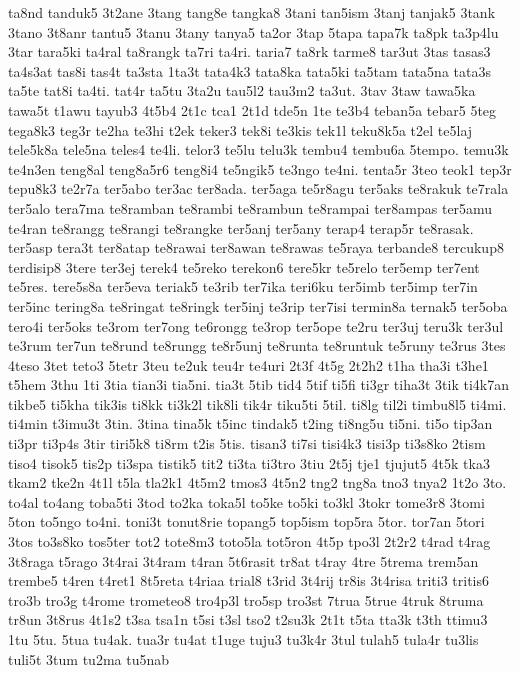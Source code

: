 {ta8nd tanduk5 3t2ane 3tang tang8e tangka8 3tani tan5ism 3tanj tanjak5
3tank 3tano 3t8anr tantu5 3tanu 3tany tanya5 ta2or 3tap 5tapa tapa7k ta8pk
ta3p4lu 3tar tara5ki ta4ral ta8rangk ta7ri ta4ri. taria7 ta8rk tarme8
tar3ut 3tas tasas3 ta4s3at tas8i tas4t ta3sta 1ta3t tata4k3 tata8ka
tata5ki ta5tam tata5na tata3s ta5te tat8i ta4ti. tat4r ta5tu 3ta2u tau5l2
tau3m2 ta3ut. 3tav 3taw tawa5ka tawa5t t1awu tayub3 4t5b4 2t1c tca1 2t1d
tde5n 1te te3b4 teban5a tebar5 5teg tega8k3 teg3r te2ha te3hi t2ek teker3
tek8i te3kis tek1l teku8k5a t2el te5laj tele5k8a tele5na teles4 te4li.
telor3 te5lu telu3k tembu4 tembu6a 5tempo. temu3k te4n3en teng8al
teng8a5r6 teng8i4 te5ngik5 te3ngo te4ni. tenta5r 3teo teok1 tep3r tepu8k3
te2r7a ter5abo ter3ac ter8ada. ter5aga te5r8agu ter5aks te8rakuk te7rala
ter5alo tera7ma te8ramban te8rambi te8rambun te8rampai ter8ampas ter5amu
te4ran te8rangg te8rangi te8rangke ter5anj ter5any terap4 terap5r
te8rasak. ter5asp tera3t ter8atap te8rawai ter8awan te8rawas te5raya
terbande8 tercukup8 terdisip8 3tere ter3ej terek4 te5reko terekon6 tere5kr
te5relo ter5emp ter7ent te5res. tere5s8a ter5eva teriak5 te3rib ter7ika
teri6ku ter5imb ter5imp ter7in ter5inc tering8a te8ringat te8ringk ter5inj
te3rip ter7isi termin8a ternak5 ter5oba tero4i ter5oks te3rom ter7ong
te6rongg te3rop ter5ope te2ru ter3uj teru3k ter3ul te3rum ter7un te8rund
te8rungg te8r5unj te8runta te8runtuk te5runy te3rus 3tes 4teso 3tet teto3
5tetr 3teu te2uk teu4r te4uri 2t3f 4t5g 2t2h2 t1ha tha3i t3he1 t5hem 3thu
1ti 3tia tian3i tia5ni. tia3t 5tib tid4 5tif ti5fi ti3gr tiha3t 3tik
ti4k7an tikbe5 ti5kha tik3is ti8kk ti3k2l tik8li tik4r tiku5ti 5til. ti8lg
til2i timbu8l5 ti4mi. ti4min t3imu3t 3tin. 3tina tina5k t5inc tindak5
t2ing ti8ng5u ti5ni. ti5o tip3an ti3pr ti3p4s 3tir tiri5k8 ti8rm t2is
5tis. tisan3 ti7si tisi4k3 tisi3p ti3s8ko 2tism tiso4 tisok5 tis2p ti3spa
tistik5 tit2 ti3ta ti3tro 3tiu 2t5j tje1 tjujut5 4t5k tka3 tkam2 tke2n
4t1l t5la tla2k1 4t5m2 tmos3 4t5n2 tng2 tng8a tno3 tnya2 1t2o 3to. to4al
to4ang toba5ti 3tod to2ka toka5l to5ke to5ki to3kl 3tokr tome3r8 3tomi
5ton to5ngo to4ni. toni3t tonut8rie topang5 top5ism top5ra 5tor. tor7an
5tori 3tos to3s8ko tos5ter tot2 tote8m3 toto5la tot5ron 4t5p tpo3l 2t2r2
t4rad t4rag 3t8raga t5rago 3t4rai 3t4ram t4ran 5t6rasit tr8at t4ray 4tre
5trema trem5an trembe5 t4ren t4ret1 8t5reta t4riaa trial8 t3rid 3t4rij
tr8is 3t4risa triti3 tritis6 tro3b tro3g t4rome trometeo8 tro4p3l tro5sp
tro3st 7trua 5true 4truk 8truma tr8un 3t8rus 4t1s2 t3sa tsa1n t5si t3sl
tso2 t2su3k 2t1t t5ta tta3k t3th ttimu3 1tu 5tu. 5tua tu4ak. tua3r tu4at
t1uge tuju3 tu3k4r 3tul tulah5 tula4r tu3lis tuli5t 3tum tu2ma tu5nab
}

